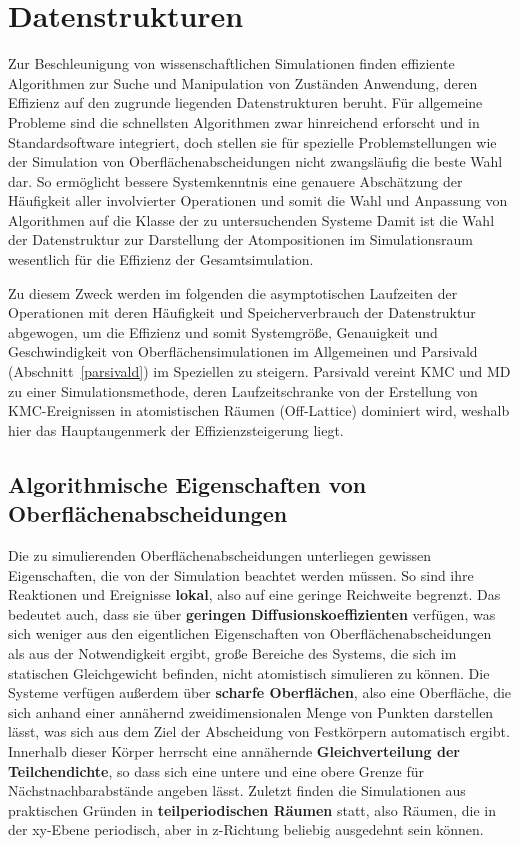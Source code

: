 \section{Datenstrukturen}
\label{datastructures}

Zur Beschleunigung von wissenschaftlichen Simulationen finden effiziente Algorithmen zur Suche und Manipulation von Zuständen Anwendung, deren Effizienz auf den zugrunde liegenden Datenstrukturen beruht.
Für allgemeine Probleme sind die schnellsten Algorithmen zwar hinreichend erforscht und in Standardsoftware integriert, doch stellen sie für spezielle Problemstellungen wie der Simulation von Oberflächenabscheidungen nicht zwangsläufig die beste Wahl dar.
So ermöglicht bessere Systemkenntnis eine genauere Abschätzung der Häufigkeit aller involvierter Operationen und somit die Wahl und Anpassung von Algorithmen auf die Klasse der zu untersuchenden Systeme
Damit ist die Wahl der Datenstruktur zur Darstellung der Atompositionen im Simulationsraum wesentlich für die Effizienz der Gesamtsimulation.

Zu diesem Zweck werden im folgenden die asymptotischen Laufzeiten der Operationen mit deren Häufigkeit und Speicherverbrauch der Datenstruktur abgewogen, um die Effizienz und somit Systemgröße, Genauigkeit und Geschwindigkeit von Oberflächensimulationen im Allgemeinen und Parsivald (Abschnitt~\ref{parsivald}) im Speziellen zu steigern.
Parsivald vereint KMC und MD zu einer Simulationsmethode, deren Laufzeitschranke von der Erstellung von KMC-Ereignissen in atomistischen Räumen (Off-Lattice) dominiert wird, weshalb hier das Hauptaugenmerk der Effizienzsteigerung liegt.

\subsection{Algorithmische Eigenschaften von Oberflächenabscheidungen}

Die zu simulierenden Oberflächenabscheidungen unterliegen gewissen Eigenschaften, die von der Simulation beachtet werden müssen.
So sind ihre Reaktionen und Ereignisse \textbf{lokal}, also auf eine geringe Reichweite begrenzt.
Das bedeutet auch, dass sie über \textbf{geringen Diffusionskoeffizienten} verfügen, was sich weniger aus den eigentlichen Eigenschaften von Oberflächenabscheidungen als aus der Notwendigkeit ergibt, große Bereiche des Systems, die sich im statischen Gleichgewicht befinden, nicht atomistisch simulieren zu können.
Die Systeme verfügen außerdem über \textbf{scharfe Oberflächen}, also eine Oberfläche, die sich anhand einer annähernd zweidimensionalen Menge von Punkten darstellen lässt, was sich aus dem Ziel der Abscheidung von Festkörpern automatisch ergibt.
Innerhalb dieser Körper herrscht eine annähernde \textbf{Gleichverteilung der Teilchendichte}, so dass sich eine untere und eine obere Grenze für Nächstnachbarabstände angeben lässt.
Zuletzt finden die Simulationen aus praktischen Gründen in \textbf{teilperiodischen Räumen} statt, also Räumen, die in der xy-Ebene periodisch, aber in z-Richtung beliebig ausgedehnt sein können.

